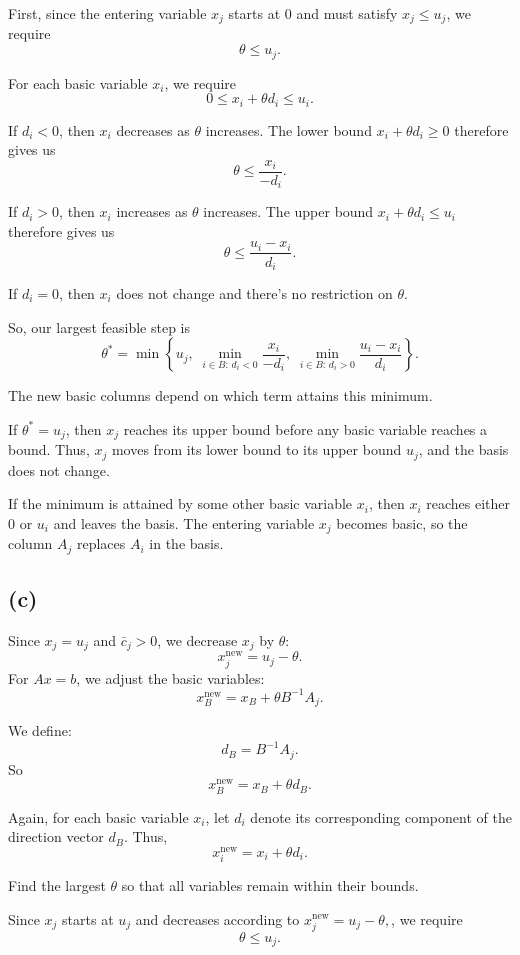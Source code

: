 \documentclass{article}
\begin{document}
First, since the entering variable $x_j$ starts at $0$ and must satisfy
$x_j\leq u_j$, we require
\[
\theta\leq u_j.
\]

For each basic variable $x_i$, we require 
\[
0\leq x_i+\theta d_i\leq u_i.
\]

If $d_i<0$, then $x_i$ decreases as $\theta$ increases. The lower bound
$x_i+\theta d_i\geq 0$ therefore gives us 
\[
\theta\leq \frac{x_i}{-d_i}.
\]

If $d_i>0$, then $x_i$ increases as $\theta$ increases. The upper bound
$x_i+\theta d_i\leq u_i$ therefore gives us 
\[
\theta\leq \frac{u_i-x_i}{d_i}.
\]

If $d_i=0$, then $x_i$ does not change and there's no restriction on
$\theta$.

So, our largest feasible step is
\[
\boxed{
\theta^*
=
\min
\left\{
u_j,\;
\min_{i\in B:\,d_i<0}\frac{x_i}{-d_i},\;
\min_{i\in B:\,d_i>0}\frac{u_i-x_i}{d_i}
\right\}.}
\]

The new basic columns depend on which term attains this minimum.

If $\theta^*=u_j$, then $x_j$ reaches its upper bound before any basic
variable reaches a bound. Thus, $x_j$ moves from its lower bound to its
upper bound $u_j$, and the basis does not change.

If the minimum is attained by some other basic variable $x_i$, then $x_i$
reaches either $0$ or $u_i$ and leaves the basis. The entering variable
$x_j$ becomes basic, so the column $A_j$ replaces $A_i$ in the basis.




\vspace{5mm}
\subsection*{(c)}

Since $x_j=u_j$ and $\bar c_j>0$, we decrease $x_j$ by $\theta$:
\[
x_j^{\mathrm{new}}=u_j-\theta.
\]
For $Ax=b$, we adjust the basic variables: 
\[
x_B^{\mathrm{new}}
=
x_B+\theta B^{-1}A_j.
\]

We define: 
\[
\boxed{d_B=B^{-1}A_j.}
\]
So 
\[
x_B^{\mathrm{new}}=x_B+\theta d_B.
\]

Again, for each basic variable $x_i$, let $d_i$ denote its corresponding
component of the direction vector $d_B$. Thus,
\[
x_i^{\mathrm{new}}=x_i+\theta d_i.
\]

Find the largest $\theta$ so that all variables remain within
their bounds.

Since $x_j$ starts at $u_j$ and decreases according to $x_j^{\mathrm{new}}=u_j-\theta,$, we require
\[
\theta\leq u_j.
\]
\end{document}

